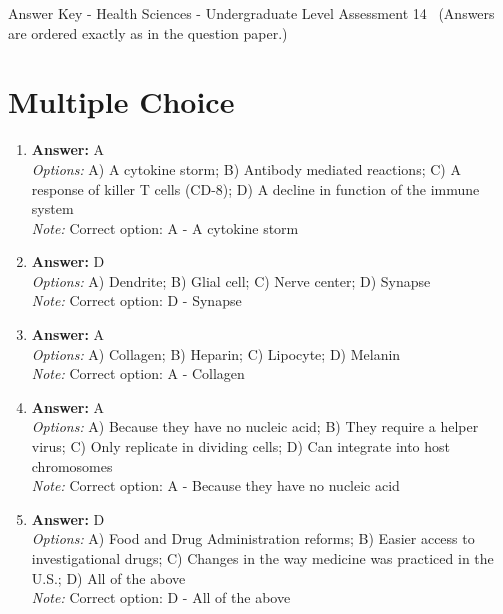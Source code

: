 \documentclass[12pt]{article}
\begin{document}
\begin{center}
Answer Key - Health Sciences - Undergraduate Level Assessment 14 \
\small (Answers are ordered exactly as in the question paper.)
\end{center}

\section*{Multiple Choice}
\begin{enumerate}[label=\arabic*.]
\item \textbf{Answer:} A
\\ \textit{Options:} A) A cytokine storm; B) Antibody mediated reactions; C) A response of killer T cells (CD-8); D) A decline in function of the immune system
\\ \textit{Note:} Correct option: A - A cytokine storm
\item \textbf{Answer:} D
\\ \textit{Options:} A) Dendrite; B) Glial cell; C) Nerve center; D) Synapse
\\ \textit{Note:} Correct option: D - Synapse
\item \textbf{Answer:} A
\\ \textit{Options:} A) Collagen; B) Heparin; C) Lipocyte; D) Melanin
\\ \textit{Note:} Correct option: A - Collagen
\item \textbf{Answer:} A
\\ \textit{Options:} A) Because they have no nucleic acid; B) They require a helper virus; C) Only replicate in dividing cells; D) Can integrate into host chromosomes
\\ \textit{Note:} Correct option: A - Because they have no nucleic acid
\item \textbf{Answer:} D
\\ \textit{Options:} A) Food and Drug Administration reforms; B) Easier access to investigational drugs; C) Changes in the way medicine was practiced in the U.S.; D) All of the above
\\ \textit{Note:} Correct option: D - All of the above
\end{enumerate}
\end{document}
